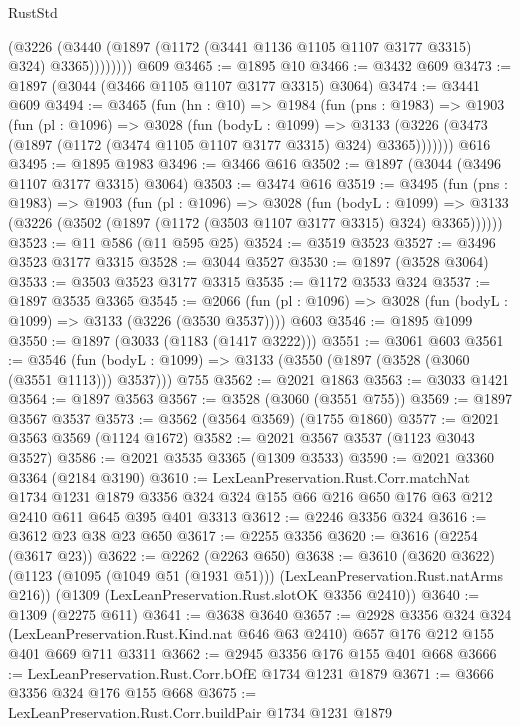 \begin{lexlean}{RustStd}
\begin{coremodule}
              (@3226 (@3440 (@1897 (@1172 (@3441 @1136 @1105 @1107 @3177 @3315) @324) @3365))))))))
    @609
@3465 := @1895 @10
@3466 := @3432 @609
@3473 := @1897 (@3044 (@3466 @1105 @1107 @3177 @3315) @3064)
@3474 := @3441 @609
@3494 := @3465
    (fun (hn : @10) =>
    @1984
      (fun (pns : @1983) =>
      @1903
        (fun (pl : @1096) =>
        @3028
          (fun (bodyL : @1099) =>
          @3133 (@3226 (@3473 (@1897 (@1172 (@3474 @1105 @1107 @3177 @3315) @324) @3365)))))))
    @616
@3495 := @1895 @1983
@3496 := @3466 @616
@3502 := @1897 (@3044 (@3496 @1107 @3177 @3315) @3064)
@3503 := @3474 @616
@3519 := @3495
    (fun (pns : @1983) =>
    @1903
      (fun (pl : @1096) =>
      @3028
        (fun (bodyL : @1099) =>
        @3133 (@3226 (@3502 (@1897 (@1172 (@3503 @1107 @3177 @3315) @324) @3365))))))
@3523 := @11 @586 (@11 @595 @25)
@3524 := @3519 @3523
@3527 := @3496 @3523 @3177 @3315
@3528 := @3044 @3527
@3530 := @1897 (@3528 @3064)
@3533 := @3503 @3523 @3177 @3315
@3535 := @1172 @3533 @324
@3537 := @1897 @3535 @3365
@3545 := @2066 (fun (pl : @1096) => @3028 (fun (bodyL : @1099) => @3133 (@3226 (@3530 @3537)))) @603
@3546 := @1895 @1099
@3550 := @1897 (@3033 (@1183 (@1417 @3222)))
@3551 := @3061 @603
@3561 := @3546
    (fun (bodyL : @1099) => @3133 (@3550 (@1897 (@3528 (@3060 (@3551 @1113))) @3537)))
    @755
@3562 := @2021 @1863
@3563 := @3033 @1421
@3564 := @1897 @3563
@3567 := @3528 (@3060 (@3551 @755))
@3569 := @1897 @3567 @3537
@3573 := @3562 (@3564 @3569) (@1755 @1860)
@3577 := @2021 @3563 @3569 (@1124 @1672)
@3582 := @2021 @3567 @3537 (@1123 @3043 @3527)
@3586 := @2021 @3535 @3365 (@1309 @3533)
@3590 := @2021 @3360 @3364 (@2184 @3190)
@3610 := LexLeanPreservation.Rust.Corr.matchNat
    @1734
    @1231
    @1879
    @3356
    @324
    @324
    @155
    @66
    @216
    @650
    @176
    @63
    @212
    @2410
    @611
    @645
    @395
    @401
    @3313
@3612 := @2246 @3356 @324
@3616 := @3612 @23 @38 @23 @650
@3617 := @2255 @3356
@3620 := @3616 (@2254 (@3617 @23))
@3622 := @2262 (@2263 @650)
@3638 := @3610
    (@3620 @3622)
    (@1123 (@1095 (@1049 @51 (@1931 @51))) (LexLeanPreservation.Rust.natArms @216))
    (@1309 (LexLeanPreservation.Rust.slotOK @3356 @2410))
@3640 := @1309 (@2275 @611)
@3641 := @3638 @3640
@3657 := @2928
    @3356
    @324
    @324
    (LexLeanPreservation.Rust.Kind.nat @646 @63 @2410)
    @657
    @176
    @212
    @155
    @401
    @669
    @711
    @3311
@3662 := @2945 @3356 @176 @155 @401 @668
@3666 := LexLeanPreservation.Rust.Corr.bOfE @1734 @1231 @1879
@3671 := @3666 @3356 @324 @176 @155 @668
@3675 := LexLeanPreservation.Rust.Corr.buildPair @1734 @1231 @1879

\end{coremodule}
\end{lexlean}
